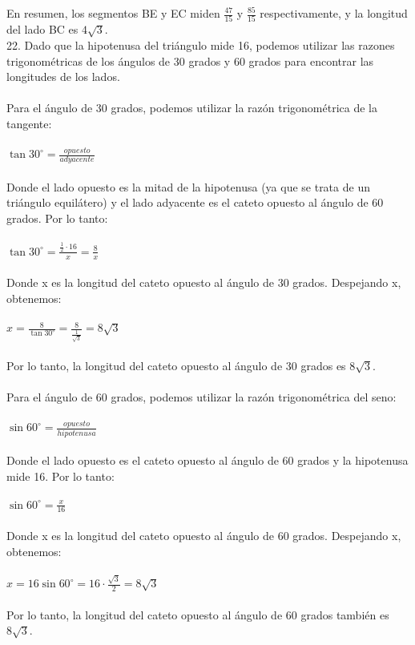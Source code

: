 \documentclass{article}
\begin{document}
En resumen, los segmentos BE y EC miden $\frac{47}{15}$ y $\frac{85}{15}$ respectivamente, y la longitud del lado BC es $4\sqrt{3}$.\\
{\Large 22.}
Dado que la hipotenusa del triángulo mide 16, podemos utilizar las razones trigonométricas de los ángulos de 30 grados y 60 grados para encontrar las longitudes de los lados.\\
\\
Para el ángulo de 30 grados, podemos utilizar la razón trigonométrica de la tangente:\\
\\
$\tan 30^\circ = \frac{opuesto}{adyacente}$\\
\\
Donde el lado opuesto es la mitad de la hipotenusa (ya que se trata de un triángulo equilátero) y el lado adyacente es el cateto opuesto al ángulo de 60 grados. Por lo tanto:\\
\\
$\tan 30^\circ = \frac{\frac{1}{2} \cdot 16}{x} = \frac{8}{x}$\\
\\
Donde x es la longitud del cateto opuesto al ángulo de 30 grados. Despejando x, obtenemos:\\
\\
$x = \frac{8}{\tan 30^\circ} = \frac{8}{\frac{1}{\sqrt{3}}} = 8\sqrt{3}$\\
\\
Por lo tanto, la longitud del cateto opuesto al ángulo de 30 grados es $8\sqrt{3}$.\\
\\
Para el ángulo de 60 grados, podemos utilizar la razón trigonométrica del seno:\\
\\
$\sin 60^\circ = \frac{opuesto}{hipotenusa}$\\
\\
Donde el lado opuesto es el cateto opuesto al ángulo de 60 grados y la hipotenusa mide 16. Por lo tanto:\\
\\
$\sin 60^\circ = \frac{x}{16}$\\
\\
Donde x es la longitud del cateto opuesto al ángulo de 60 grados. Despejando x, obtenemos:\\
\\
$x = 16\sin 60^\circ = 16\cdot \frac{\sqrt{3}}{2} = 8\sqrt{3}$\\
\\
Por lo tanto, la longitud del cateto opuesto al ángulo de 60 grados también es $8\sqrt{3}$.\\
\end{document}
